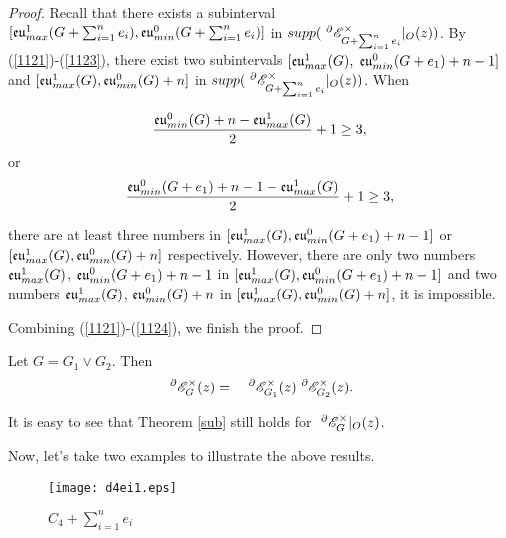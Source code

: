 \begin{proof}
Recall that there exists a subinterval $[{\mathfrak{eu}}^{1}_{max}(G +\sum ^{n}_{i=1}e_{i}),
   {\mathfrak{eu}}^{0}_{min}(G +\sum ^{n}_{i=1}e_{i})]$ in $supp(~^{\partial}{{\mathscr{E}}}^{\times}_{G+\sum ^{n}_{i=1}e_{i}}|_O(z))$. By (\ref{1121})-(\ref{1123}),
 there exist two subintervals  $[{\mathfrak{eu}}^{1}_{max}(G),$ ${\mathfrak{eu}}^{0}_{min}(G +e_{1})+n-1]$ and
   $[{\mathfrak{eu}}^{1}_{max}(G),{\mathfrak{eu}}^{0}_{min}(G)+n]$   in $supp(~^{\partial}{{\mathscr{E}}}^{\times}_{G+\sum ^{n}_{i=1}e_{i}}|_O(z))$. When

  \begin{equation}\label{1129}
 \frac{{\mathfrak{eu}}^{0}_{min}(G )+n-{\mathfrak{eu}}^{1}_{max}(G)}{2}+1\geq 3,
 \end{equation}
 or
   \begin{equation}\label{1124}
  \frac{{\mathfrak{eu}}^{0}_{min}(G +e_{1})+n-1-{\mathfrak{eu}}^{1}_{max}(G)}{2}+1\geq 3,
\end{equation}
{there are at least three numbers in $[{\mathfrak{eu}}^{1}_{max}(G),{\mathfrak{eu}}^{0}_{min}(G +e_{1})+n-1]$ or $[{\mathfrak{eu}}^{1}_{max}(G),\\
{\mathfrak{eu}}^{0}_{min}(G)+n]$ respectively.  However, there are only two numbers ${\mathfrak{eu}}^{1}_{max}(G)$, ${\mathfrak{eu}}^{0}_{min}(G +e_{1})+n-1$ in  $[{\mathfrak{eu}}^{1}_{max}(G),
{\mathfrak{eu}}^{0}_{min}(G +e_{1})+n-1]$ and two numbers ${\mathfrak{eu}}^{1}_{max}(G)$, ${\mathfrak{eu}}^{0}_{min}(G)+n$  in $[{\mathfrak{eu}}^{1}_{max}(G),
{\mathfrak{eu}}^{0}_{min}(G)+n]$,  it is impossible.

Combining (\ref{1121})-(\ref{1124}), we  finish the proof.}

\end{proof}


\begin{thm}\cite{GMT21a}\label{join}
Let $G=G_{1}\vee G_{2}$. Then
\begin{eqnarray*}
~^{\partial}{{\mathscr{E}}}^{\times}_{G}(z) &=& ~^{\partial}{{\mathscr{E}}}^{\times}_{G_{1}}(z) ~^{\partial}{{\mathscr{E}}}^{\times}_{G_{2}}(z).\label{sub1}
\end{eqnarray*}

\end{thm}


\begin{rem}
{It is easy to see that Theorem \ref{sub} still holds for $~^{\partial}{{\mathscr{E}}}^{\times}_{G}|_O(z)$.
}
\end {rem}

Now, let's take two examples to illustrate the above results.

\begin{figure}[h]
  \centering
  \texttt{[image: d4ei1.eps]}
 \caption{$C_4+\sum ^{n}_{i=1}e_{i}$ }
 \label{d4ei}
\end{figure}

